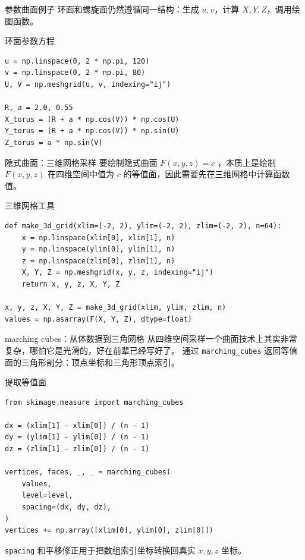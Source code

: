 \documentclass[aspectratio=169,11pt]{ctexbeamer}
\begin{document}
\begin{frame}[fragile]{参数曲面例子}
  环面和螺旋面仍然遵循同一结构：生成 \(u,v\)，计算 \(X,Y,Z\)，调用绘图函数。

  \begin{block}{环面参数方程}
\begin{Verbatim}[fontsize=\tiny]
u = np.linspace(0, 2 * np.pi, 120)
v = np.linspace(0, 2 * np.pi, 80)
U, V = np.meshgrid(u, v, indexing="ij")

R, a = 2.0, 0.55
X_torus = (R + a * np.cos(V)) * np.cos(U)
Y_torus = (R + a * np.cos(V)) * np.sin(U)
Z_torus = a * np.sin(V)
\end{Verbatim}
  \end{block}
\end{frame}

\begin{frame}[fragile]{隐式曲面：三维网格采样}
要绘制隐式曲面 \(F(x,y,z)=c\) ，本质上是绘制 \(F(x,y,z)\) 在四维空间中值为 $c$ 的等值面，因此需要先在三维网格中计算函数值。

  \begin{block}{三维网格工具}
\begin{Verbatim}[fontsize=\tiny]
def make_3d_grid(xlim=(-2, 2), ylim=(-2, 2), zlim=(-2, 2), n=64):
    x = np.linspace(xlim[0], xlim[1], n)
    y = np.linspace(ylim[0], ylim[1], n)
    z = np.linspace(zlim[0], zlim[1], n)
    X, Y, Z = np.meshgrid(x, y, z, indexing="ij")
    return x, y, z, X, Y, Z

x, y, z, X, Y, Z = make_3d_grid(xlim, ylim, zlim, n)
values = np.asarray(F(X, Y, Z), dtype=float)
\end{Verbatim}
  \end{block}
\end{frame}

\begin{frame}[fragile]{marching cubes：从体数据到三角网格}
  从四维空间采样一个曲面技术上其实非常复杂，哪怕它是光滑的，好在前辈已经写好了。
 通过 \texttt{marching\_cubes} 返回等值面的三角形剖分：顶点坐标和三角形顶点索引。

  \begin{block}{提取等值面}
\begin{Verbatim}[fontsize=\tiny]
from skimage.measure import marching_cubes

dx = (xlim[1] - xlim[0]) / (n - 1)
dy = (ylim[1] - ylim[0]) / (n - 1)
dz = (zlim[1] - zlim[0]) / (n - 1)

vertices, faces, _, _ = marching_cubes(
    values,
    level=level,
    spacing=(dx, dy, dz),
)
vertices += np.array([xlim[0], ylim[0], zlim[0]])
\end{Verbatim}
  \end{block}

  \texttt{spacing} 和平移修正用于把数组索引坐标转换回真实 \(x,y,z\) 坐标。
\end{frame}
\end{document}
